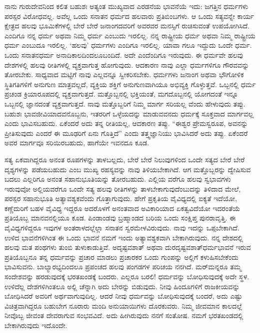 ನಾನು ಗುರುದೇವನಿಂದ ಕಲಿತ ಬಹುಶಃ ಅತ್ಯಂತ ಮುಖ್ಯವಾದ ಎರಡನೆಯ ಭಾವನೆಯೆ ಇದು: ಜಗತ್ತಿನ ಧರ್ಮಗಳು ಪರಸ್ಪರ ವಿರೋಧವಲ್ಲ. ಅವೆಲ್ಲ ಒಂದು ಸನಾತನ ಧರ್ಮದ ಹಲವಾರು ಪ್ರತಿಬಿಂಬಗಳು. ಆ ಒಂದು ಸತ್ಯವನ್ನೇ ಕಾರ್ಯ ಕ್ಷೇತ್ರದ ಹಲವು ಭೂಮಿಕೆಗಳಲ್ಲಿ ಬೇರೆ ಬೇರೆ ಜನಾಂಗದವರಿಗೆ ಅವರವರ ಮನಸ್ಸಿಗೆ ರುಚಿಸುವಂತೆ ಉಪಯೋಗಿಸಿದೆ. ಎಂದಿಗೂ ನನ್ನ ಧರ್ಮ ಅಥವಾ ನಿಮ್ಮ ಧರ್ಮ ಎಂಬುದು ಇರಲಿಲ್ಲ. ನನ್ನ ರಾಷ್ಟ್ರೀಯ ಧರ್ಮ ಅಥವಾ ನಿಮ್ಮ ರಾಷ್ಟ್ರೀಯ ಧರ್ಮ ಎಂಬುದೂ ಇರಲಿಲ್ಲ. ‘ಹಲವು’ ಧರ್ಮಗಳು ಎಂದಿಗೂ ಇರಲಿಲ್ಲ. ಯಾವಾ ಗಲೂ ಇದ್ದುದು ಒಂದೇ ಧರ್ಮ. ಒಂದು ಸನಾತನಧರ್ಮ ಅನಾದಿಕಾಲದಿಂದಲೂಬಂದಿದೆ. ಅದೇ ಎಂದೆಂದಿಗೂ ಇರುವುದು. ಈ ಧರ್ಮವೇ ಹಲವು ದೇಶಗಳಲ್ಲಿ ಹಲವು ರೀತಿಗಳಲ್ಲಿ ವ್ಯಕ್ತವಾಗುತ್ತ ಹೋಗುವುದು. ಆದಕಾರಣ ನಾವು ಎಲ್ಲಾ ಧರ್ಮಗಳಿಗೂ ಗೌರವವನ್ನು ತೋರಬೇಕು. ಸಾಧ್ಯವಾದ ಮಟ್ಟಿಗೆ ನಾವು ಎಲ್ಲವನ್ನೂ ಸ್ವೀಕರಿಸಬೇಕು. ಧರ್ಮಗಳು ಜನಾಂಗ ಅಥವಾ ಭೌಗೋಳಿಕ ಸ್ಥಿತಿಗತಿಗಳಿಗೆ ಅನುಗುಣ ಮಾತ್ರವಲ್ಲದೆ, ವ್ಯಕ್ತಿಯ ಶಕ್ತಿಗೆ ಅನುಗುಣವಾಗಿಯೂ ಅಭಿವ್ಯಕ್ತಿ ಗೊಳ್ಳುತ್ತವೆ. ಒಬ್ಬನಲ್ಲಿ ಧರ್ಮ ಪ್ರಚಂಡ ಕ್ರಿಯಾರೂಪದಲ್ಲಿ ವ್ಯಕ್ತವಾಗುತ್ತದೆ. ಮತ್ತೊಬ್ಬನಲ್ಲಿ ಭಕ್ತಿಯಂತೆ, ಮಗದೊಬ್ಬನಲ್ಲಿ ಯೋಗದಂತೆ ಇನ್ನೂ ಒಬ್ಬನಲ್ಲಿ ಜ್ಞಾನದಂತೆ ವ್ಯಕ್ತವಾಗುತ್ತದೆ. ನಾವು ಮತ್ತೊಬ್ಬರಿಗೆ ನಿಮ್ಮ ಮಾರ್ಗ ಸರಿಯಲ್ಲ ವೆಂದು ಹೇಳುವುದು ತಪ್ಪು. ಬಹುಶಃ ಭಾವಜೀವಿಯಾದವನೊಬ್ಬನು, ಇತರರಿಗೆ ಒಳ್ಳೆಯದನ್ನು ಮಾಡುವವನದು ಧರ್ಮಕ್ಕೆ ಸೂಕ್ತವಾದ ಮಾರ್ಗವಲ್ಲ ಎಂದು ಭಾವಿಸಬಹುದು. ಏಕೆಂದರೆ ಅದು ತನ್ನ ರೀತಿಯಲ್ಲ, ಆದಕಾರಣ ತಪ್ಪು. “ಈಶ್ವರ ಪ್ರೇಮಸ್ವರೂಪ, ಅವನನ್ನು ಪ್ರೀತಿಸುವುದು ಎಂದರೆ ಈ ಮೂಢರಿಗೆ ಏನು ಗೊತ್ತಿದೆ” ಎಂದು ತತ್ತ್ವಜ್ಞಾನಿಯು ಭಾವಿಸಿದರೆ ಅದು ತಪ್ಪು. ಏಕೆಂದರೆ ಅವರ ಮಾರ್ಗವೂ ಸರಿಯಿರಬಹುದು, ಹಾಗೆಯೇ ಇವನದೂ ಕೂಡ.

ಸತ್ಯ ಏಕವಾಗಿದ್ದರೂ ಅನಂತ ರೂಪಗಳನ್ನು ತಾಳಬಲ್ಲದು, ಬೇರೆ ಬೇರೆ ನಿಲುವುಗಳಿಂದ ಒಂದೇ ಸತ್ಯದ ಬೇರೆ ಬೇರೆ ದೃಶ್ಯಗಳನ್ನು ಪಡೆಯಬಹುದು ಎಂಬ ಮುಖ್ಯ ರಹಸ್ಯವನ್ನು ನಾವು ತಿಳಿಯಬೇಕಾಗಿದೆ. ಆಗ ಮತ್ತೊಬ್ಬರನ್ನು ದ್ವೇಷಿಸುವ ಬದಲು ಎಲ್ಲರಿಗೂ ಅನಂತ ಸಹಾನುಭೂತಿಯನ್ನು ತೋರಬಹುದು. ಎಲ್ಲಿಯ ವರೆಗೂ ಹಲವು ಸ್ವಭಾವಗಳು ಇರುವುವೋ ಅಲ್ಲಿಯವರೆಗೂ ಒಂದೇ ಸತ್ಯ ಹಲವು ರೀತಿಗಳನ್ನು ತಾಳಬೇಕಾಗುವುದೆಂಬುದನ್ನು ತಿಳಿದಾದ ಮೇಲೆ, ಪರಸ್ಪರ ಸಹಾನುಭೂತಿ ಅತ್ಯಾವಶ್ಯಕವೆಂದು ಗೊತ್ತಾಗುವುದು. ಹೇಗೆ ಪ್ರಕೃತಿಯ ವೈವಿಧ್ಯದಲ್ಲಿ ಐಕ್ಯತೆ ಇದೆಯೋ, ಕಣ್ಣೆದುರಿಗೆ ಬಹಳ ವೈವಿಧ್ಯ ಇದ್ದರೂ ಅದರೊಳಗೆ ಅನಂತವಾದ ಅವಿಕಾರಿಯಾದ ಏಕತ್ವವಿದೆಯೋ ಇದರಂತೆಯೆ ಪ್ರತಿಯೊಬ್ಬ ಮಾನವನಲ್ಲಿಯೂ ಕೂಡ. ಪಿಂಡಾಂಡವು ಬ್ರಹ್ಮಾಂಡದ ಬರಿಯ ಒಂದು ಸಂಕ್ಷಿಪ್ತ ಪುನರಾವೃತ್ತಿ. ಈ ವೈವಿಧ್ಯಗಳಿದ್ದರೂ ಇವುಗಳ ಅಂತರಾಳದಲ್ಲೆಲ್ಲಾ ಸನಾತನ ಸ್ವರಮೇಳವಿರುವುದು. ನಾವು ಇದನ್ನು ಒಪ್ಪಬೇಕಾಗಿದೆ. ಉಳಿದ ಭಾವನೆಗಳಿಗಿಂತ ಈ ಒಂದು ಭಾವನೆ ನಮಗೆ ಇಂದು ಅತ್ಯಾವಶ್ಯಕವಾಗಿ ಬೇಕಾಗಿರುವುದು. ನನ್ನ ದೇಶದಲ್ಲಿ ಹಲವು ಮತ ಪಂಥಗಳು ತುಂಬಿ ತುಳುಕಾಡುತ್ತಿವೆ. ಅದೃಷ್ಟವಶಾತ್​ ಅಥವಾ ದುರದೃಷ್ಟವಶಾತ್​ ಧರ್ಮಭಾವನೆ ಇರುವ ಪ್ರತಿಯೊಬ್ಬನೂ ತನ್ನ ಧರ್ಮವನ್ನು ಪ್ರಚಾರ ಮಾಡಲು ಪ್ರಚಾರಕರ ಒಂದು ಗುಂಪನ್ನು ಅಲ್ಲಿಗೆ ಕಳುಹಿಸಬೇಕೆಂದು ಭಾವಿಸುವನು. ಬಾಲ್ಯಾರಭ್ಯದಿಂದಲೂ ಪ್ರಪಂಚದ ಹಲವು ಪಂಗಡಗಳ ಪರಿಚಯ ನನಗಿದೆ. ಮರ್​ಮನ್ನರೂ ತಮ್ಮ ಸಂದೇಶವನ್ನು ಹರಡುವುದಕ್ಕೆ ಭರತಖಂಡಕ್ಕೆ ಬಂದರು. ಎಲ್ಲರೂ ಬರಲಿ! ಧರ್ಮವನ್ನು ಬೋಧಿಸುವುದಕ್ಕೆ ಅದೇ ಸ್ಥಳ. ಉಳಿದೆಲ್ಲ ದೇಶಗಳಿಗಿಂತಲೂ ಅಲ್ಲಿ ಚೆನ್ನಾಗಿ ಅದು ಬೇರನ್ನು ಬಿಡುವುದು. ನೀವು ಹಿಂದೂಗಳಿಗೆ ರಾಜಕೀಯವನ್ನು ಬೋಧಿಸಿದರೆ ಅವರಿಗೆ ಅರ್ಥವಾಗುವುದಿಲ್ಲ. ಆದರೆ ನೀವು ಧರ್ಮವನ್ನು ಬೋಧಿಸುವುದಕ್ಕೆ ಬಂದರೆ, ಅದು ಎಷ್ಟು ವಿಚಿತ್ರವಾಗಿದ್ದರೂ ಬಹುಬೇಗ ನೂರಾರು ಮಂದಿ ಅನುಯಾಯಿಗಳು ದೊರಕುವರು. ನಿಮ್ಮ ಜೀವಮಾನ ಕಾಲದಲ್ಲೆ ನೀವೊಬ್ಬ ಜೀವಂತ ದೇವರಾಗುವ ಸಂಭವವಿದೆ. ಅದು ಹೀಗಿರುವುದು ನನಗೆ ಸಂತೋಷ. ನಮಗೆ ಭರತಖಂಡದಲ್ಲಿ ಬೇಕಾಗಿರುವುದು ಇದೊಂದೇ.

